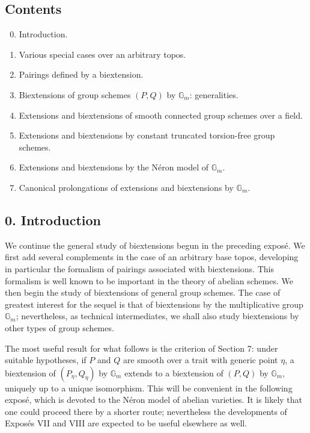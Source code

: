 \documentclass[11pt]{article}
\theoremstyle{plain}
\theoremstyle{definition}
\theoremstyle{remark}
\newcommand{\Gm}{\mathbb G_m}
\begin{document}
\subsection*{Contents}

\begin{enumerate}[label=\arabic*.]
\setcounter{enumi}{-1}
\item Introduction.
\item Various special cases over an arbitrary topos.
\item Pairings defined by a biextension.
\item Biextensions of group schemes \((P,Q)\) by \(\Gm\): generalities.
\item Extensions and biextensions of smooth connected group schemes over a field.
\item Extensions and biextensions by constant truncated torsion-free group schemes.
\item Extensions and biextensions by the Néron model of \(\Gm\).
\item Canonical prolongations of extensions and biextensions by \(\Gm\).
\end{enumerate}

\subsection*{0. Introduction}

We continue the general study of biextensions begun in the preceding exposé. We
first add several complements in the case of an arbitrary base topos, developing
in particular the formalism of pairings associated with biextensions. This
formalism is well known to be important in the theory of abelian schemes. We then
begin the study of biextensions of general group schemes. The case of greatest
interest for the sequel is that of biextensions by the multiplicative group
\(\Gm\); nevertheless, as technical intermediates, we shall also study
biextensions by other types of group schemes.

The most useful result for what follows is the criterion of Section 7: under
suitable hypotheses, if \(P\) and \(Q\) are smooth over a trait with generic point
\(\eta\), a biextension of \((P_\eta,Q_\eta)\) by \(\Gm\) extends to a
biextension of \((P,Q)\) by \(\Gm\), uniquely up to a unique isomorphism. This
will be convenient in the following exposé, which is devoted to the Néron model
of abelian varieties. It is likely that one could proceed there by a shorter
route; nevertheless the developments of Exposés VII and VIII are expected to be
useful elsewhere as well.
\end{document}
